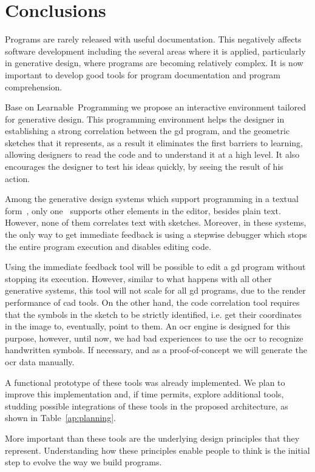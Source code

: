 
% 
% 

\section{Conclusions}
\label{sec:fin}

Programs are rarely released with useful documentation. This negatively affects software development including the several areas where it is applied, particularly in generative design, where programs are becoming relatively complex. It is now important to develop good tools for program documentation and program comprehension.

Base on Learnable~Programming we propose an interactive environment tailored for generative design. This programming environment helps the designer in establishing a strong correlation between the \ac{gd} program, and the geometric sketches that it represents, as a result it eliminates the first barriers to learning, allowing designers to read the code and to understand it at a high level. It also encourages the designer to test his ideas quickly, by seeing the result of his action.

Among the generative design systems which support programming in a textual form~\cite{aish2012designscript,lopes2011portable}, only one~\cite{lopes2011portable} supports other elements in the editor, besides plain text. However, none of them correlates text with sketches. Moreover, in these systems, the only way to get immediate feedback is using a stepwise debugger which stops the entire program execution and disables editing code.

Using the immediate feedback tool will be possible to edit a \ac{gd} program without stopping its execution. However, similar to what happens with all other generative systems, this tool will not scale for all \ac{gd} programs, due to the render performance of \ac{cad} tools. On the other hand, the code correlation tool requires that the symbols in the sketch to be strictly identified, i.e. get their coordinates in the image to, eventually, point to them. An \ac{ocr} engine is designed for this purpose, however, until now, we had bad experiences to use the \ac{ocr} to recognize handwritten symbols. If necessary, and as a proof-of-concept we will generate the \ac{ocr} data manually.

A functional prototype of these tools was already implemented. We plan to improve this implementation and, if time permits, explore additional tools, studding possible integrations of these tools in the proposed architecture, as shown in  Table~\ref{ap:planning}.

More important than these tools are the underlying design principles that they represent. Understanding how these principles enable people to think is the initial step to evolve the way we build programs.